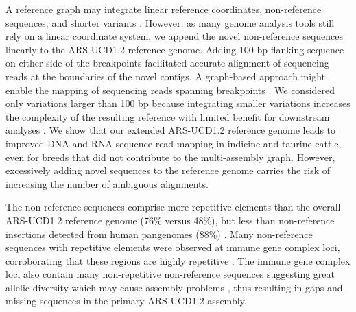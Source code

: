 \documentclass[../main.tex]{subfiles}
\begin{document}
A reference graph may integrate linear reference coordinates, non-reference sequences, and shorter variants \citep{hickey2020genotyping}. However, as many genome analysis tools still rely on a linear coordinate system, we append the novel non-reference sequences linearly to the ARS-UCD1.2 reference genome. Adding 100 bp flanking sequence on either side of the breakpoints facilitated accurate alignment of sequencing reads at the boundaries of the novel contigs. A graph-based approach might enable the mapping of sequencing reads spanning breakpoints \citep{hickey2020genotyping}. We considered only variations larger than 100 bp because integrating smaller variations increases the complexity of the resulting reference with limited benefit for downstream analyses \citep{li2020design}. We show that our extended ARS-UCD1.2 reference genome leads to improved DNA and RNA sequence read mapping in indicine and taurine cattle, even for breeds that did not contribute to the multi-assembly graph. However, excessively adding novel sequences to the reference genome carries the risk of increasing the number of ambiguous alignments.

The non-reference sequences comprise more repetitive elements than the overall ARS-UCD1.2 reference genome (76\% versus 48\%), but less than non-reference insertions detected from human pangenomes (88\%) \citep{sherman2019assembly,ameur2018novo}. Many non-reference sequences with repetitive elements were observed at immune gene complex loci, corroborating that these regions are highly repetitive \citep{schwartz2017evolution}. The immune gene complex loci also contain many non-repetitive non-reference sequences suggesting great allelic diversity which may cause assembly problems \citep{bakshy2021development}, thus resulting in gaps and missing sequences in the primary ARS-UCD1.2 assembly. 
\end{document}

